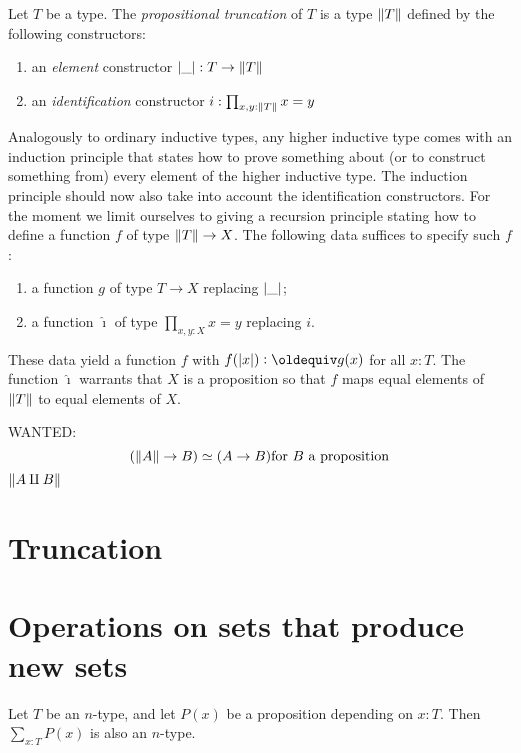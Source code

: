 \begin{definition}\label{def:prop-trunc}
Let $T$ be a type. The \emph{propositional truncation} of $T$
is a type  $\lVert T\rVert$ defined by the following constructors:
\begin{enumerate}
\item an \emph{element} constructor $\lvert\_\rvert : T \to\lVert T\rVert$
\item an \emph{identification} constructor $i: \prod_{x,y:\lVert T\rVert} x=y$
\end{enumerate}
\end{definition}
Analogously to ordinary inductive types, any higher inductive type
comes with an induction principle that states how to prove something
about (or to construct something from) every element of the higher inductive type.
The induction principle should now also take into account 
the identification constructors. For the moment we limit
ourselves to giving a recursion principle stating how to define
a function $f$ of type $\lVert T\rVert \to X$. The following data
suffices to specify such $f$:
\begin{enumerate}
\item a function $g$ of type $T\to X$ replacing $\lvert\_\rvert$; 
\item a function $\hat{\imath}$ of type $\prod_{x,y:X} x = y$ replacing $i$.
\end{enumerate}
These data yield a function $f$ with $f(\trunc{x})\defeq g(x)$ 
for all $x:T$. The function $\hat{\imath}$ warrants that $X$ is a
proposition so that $f$ maps equal elements of $\lVert T\rVert$ to equal
elements of $X$.

WANTED:
\[
(\lVert A\rVert \to B) \simeq (A \to B) \text{for $B$ a proposition}
\]
$\lVert A \amalg B\rVert$


\section{Truncation}
\label{sec:truncation}

\section{Operations on sets that produce new sets}
\label{sec:operations-on-sets}

\begin{lemma}\label{lem:subtype}
Let $T$ be an $n$-type, and let $P(x)$ be a proposition depending on $x:T$. 
Then $\sum_{x:T} P(x)$ is also an $n$-type.
\end{lemma}

